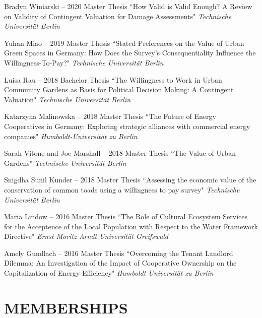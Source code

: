 \documentclass[paper=a4,fontsize=11pt]{scrartcl} %
\newcommand{\NewPart}[2]{\section*{\uppercase{#1} #2}}
\newcommand{\ThesisEntry}[5]{
		\noindent #1 -- #2 #3 ``#4" \textit{#5}}
\begin{document}
\begin{etaremune}
\item \ThesisEntry{Bradyn Winiarski}{2020}{Master Thesis}{How Valid is Valid Enough? A Review on Validity of Contingent Valuation for Damage Assessments}{Technische Universität Berlin}

\item \ThesisEntry{Yuhan Miao}{2019}{Master Thesis}{Stated Preferences on the Value of Urban Green Spaces in Germany: How Does the Survey's Consequentiality Influence the Willingness-To-Pay?}{Technische Universität Berlin}

\item \ThesisEntry{Luisa Rau}{2018}{Bachelor Thesis}{The Willingness to Work in Urban Community Gardens as Basis for Political Decision Making: A Contingent Valuation}{Technische Universität Berlin}

\item \ThesisEntry{Katarzyna Malinowska}{2018}{Master Thesis}{The Future of Energy Cooperatives in Germany: Exploring strategic alliances with commercial energy companies}{Humboldt-Universität zu Berlin}

\item \ThesisEntry{Sarah Vitone and Joe Marshall}{2018}{Master Thesis}{The Value of Urban Gardens}{Technische Universität Berlin}

\item \ThesisEntry{Snigdha Sunil Kunder}{2018}{Master Thesis}{Assessing the economic value of the conservation of common toads using a willingness to pay survey}{Technische Universität Berlin}

\item \ThesisEntry{Maria Lindow}{2016}{Master Thesis}{The Role of Cultural Ecosystem Services for the Acceptence of the Local Population with Respect to the Water Framework Directive}{Ernst Moritz Arndt Universität Greifswald}

\item \ThesisEntry{Amely Gundlach}{2016}{Master Thesis}{Overcoming the Tenant Landlord Dilemma:
An Investigation of the Impact of Cooperative Ownership on the Capitalization of Energy Efficiency}{Humboldt-Universität zu Berlin}


\end{etaremune}

\NewPart{Memberships}{}
\end{document}
